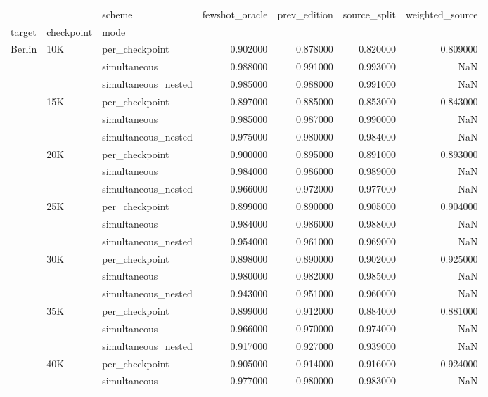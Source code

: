 \begin{tabular}{lllrrrr}
\toprule
 &  & scheme & fewshot\_oracle & prev\_edition & source\_split & weighted\_source \\
target & checkpoint & mode &  &  &  &  \\
\midrule
\multirow[t]{27}{*}{Berlin} & \multirow[t]{3}{*}{10K} & per\_checkpoint & 0.902000 & 0.878000 & 0.820000 & 0.809000 \\
 &  & simultaneous & 0.988000 & 0.991000 & 0.993000 & NaN \\
 &  & simultaneous\_nested & 0.985000 & 0.988000 & 0.991000 & NaN \\
\cline{2-7}
 & \multirow[t]{3}{*}{15K} & per\_checkpoint & 0.897000 & 0.885000 & 0.853000 & 0.843000 \\
 &  & simultaneous & 0.985000 & 0.987000 & 0.990000 & NaN \\
 &  & simultaneous\_nested & 0.975000 & 0.980000 & 0.984000 & NaN \\
\cline{2-7}
 & \multirow[t]{3}{*}{20K} & per\_checkpoint & 0.900000 & 0.895000 & 0.891000 & 0.893000 \\
 &  & simultaneous & 0.984000 & 0.986000 & 0.989000 & NaN \\
 &  & simultaneous\_nested & 0.966000 & 0.972000 & 0.977000 & NaN \\
\cline{2-7}
 & \multirow[t]{3}{*}{25K} & per\_checkpoint & 0.899000 & 0.890000 & 0.905000 & 0.904000 \\
 &  & simultaneous & 0.984000 & 0.986000 & 0.988000 & NaN \\
 &  & simultaneous\_nested & 0.954000 & 0.961000 & 0.969000 & NaN \\
\cline{2-7}
 & \multirow[t]{3}{*}{30K} & per\_checkpoint & 0.898000 & 0.890000 & 0.902000 & 0.925000 \\
 &  & simultaneous & 0.980000 & 0.982000 & 0.985000 & NaN \\
 &  & simultaneous\_nested & 0.943000 & 0.951000 & 0.960000 & NaN \\
\cline{2-7}
 & \multirow[t]{3}{*}{35K} & per\_checkpoint & 0.899000 & 0.912000 & 0.884000 & 0.881000 \\
 &  & simultaneous & 0.966000 & 0.970000 & 0.974000 & NaN \\
 &  & simultaneous\_nested & 0.917000 & 0.927000 & 0.939000 & NaN \\
\cline{2-7}
 & \multirow[t]{3}{*}{40K} & per\_checkpoint & 0.905000 & 0.914000 & 0.916000 & 0.924000 \\
 &  & simultaneous & 0.977000 & 0.980000 & 0.983000 & NaN \\

\end{tabular}
